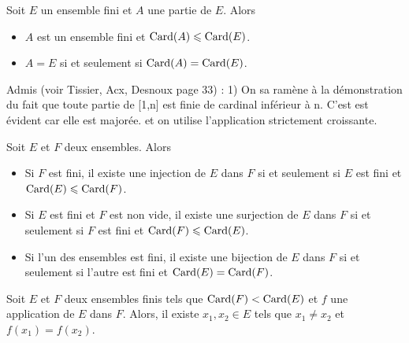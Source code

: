 \documentclass{magnolia}
\begin{document}
\begin{proposition}
Soit $E$ un ensemble fini et $A$ une partie de $E$. Alors
\begin{itemize}
\item $A$ est un ensemble fini et $\operatorname{Card}(A)\leqslant\operatorname{Card}(E)$.
\item $A=E$ si et seulement si $\operatorname{Card}(A)=\operatorname{Card}(E)$.
\end{itemize}
\end{proposition}

\begin{preuve}
Admis (voir Tissier, Acx, Desnoux page 33) :
1) On sa ramène à la démonstration du fait que toute partie de [1,n] est
   finie de cardinal inférieur à n. C'est est évident car elle est majorée.
    et on utilise l'application strictement croissante.
\end{preuve}


\begin{proposition}
Soit $E$ et $F$ deux ensembles. Alors
\begin{itemize}
\item Si $F$ est fini, il existe une injection de $E$ dans $F$ si et seulement
  si $E$ est fini et $\operatorname{Card} (E)\leqslant\operatorname{Card} (F)$.
\item Si $E$ est fini et $F$ est non vide, il existe une surjection de $E$ dans $F$ si et seulement
  si $F$ est fini et $\operatorname{Card} (F)\leqslant\operatorname{Card} (E)$.
\item Si l'un des ensembles est fini, il existe une bijection de $E$ dans $F$ si
  et seulement si l'autre est fini et $\operatorname{Card}(E)=\operatorname{Card}(F)$.
\end{itemize}
\end{proposition}

\begin{proposition}[nom={Principe des tiroirs}]
Soit $E$ et $F$ deux ensembles finis tels que $\operatorname{Card}(F)<\operatorname{Card}(E)$ et $f$ une application de $E$ dans $F$. Alors, il existe
$x_1,x_2\in E$ tels que $x_1\neq x_2$ et $f(x_1)=f(x_2)$.
\end{proposition}

\end{document}
